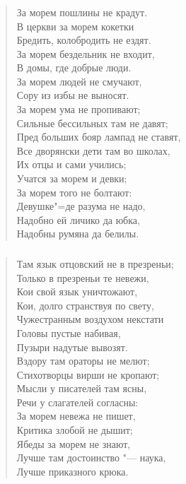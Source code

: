 \documentclass{beamer}
\begin{document}
\begin{frame}
\frametitle{}

\begin{verse}

За морем пошлины не крадут.\\
В церкви за морем кокетки\\
Бредить, колобродить не ездят.\\
За морем бездельник не входит,\\
В домы, где добрые люди.\\
За морем людей не смучают,\\
Сору из избы не выносят.\\
За морем ума не пропивают;\\
Сильные бессильных там не давят;\\
Пред больших бояр лампад не ставят,\\
Все дворянски дети там во школах,\\
Их отцы и сами учились;\\
Учатся за морем и девки;\\
За морем того не болтают:\\
Девушке"=де разума не надо,\\
Надобно ей личико да юбка,\\
Надобны румяна да белилы.
\end{verse}
\end{frame}


\begin{frame}
\frametitle{}

\begin{verse}
Там язык отцовский не в презреньи;\\
Только в презреньи те невежи,\\
Кои свой язык уничтожают,\\
Кои, долго странствуя по свету,\\
Чужестранным воздухом некстати\\
Головы пустые набивая,\\
Пузыри надутые вывозят.\\
Вздору там ораторы не мелют;\\
Стихотворцы вирши не кропают;\\
Мысли у писателей там ясны,\\
Речи у слагателей согласны:\\
За морем невежа не пишет,\\
Критика злобой не дышит;\\
Ябеды за морем не знают,\\
Лучше там достоинство "--- наука,\\
Лучше приказного крюка.
\end{verse}
\end{frame}
\end{document}
